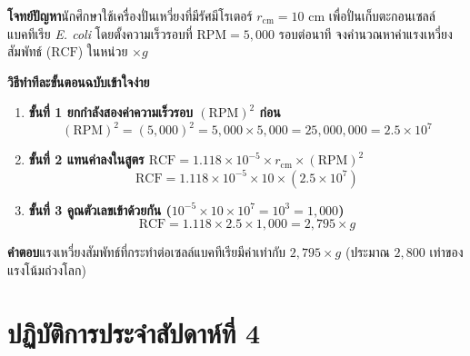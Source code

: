 \vspace{4pt}


\begin{worked}
\textbf{โจทย์ปัญหา}\quad นักศึกษาใช้เครื่องปั่นเหวี่ยงที่มีรัศมีโรเตอร์ $r_{\text{cm}} = 10\text{ cm}$ เพื่อปั่นเก็บตะกอนเซลล์แบคทีเรีย \textit{E. coli} โดยตั้งความเร็วรอบที่ $\text{RPM} = 5{,}000\text{ รอบต่อนาที}$ จงคำนวณหาค่าแรงเหวี่ยงสัมพัทธ์ ($\text{RCF}$) ในหน่วย $\times g$

\textbf{วิธีทำทีละขั้นตอนฉบับเข้าใจง่าย}
\begin{enumerate}
    \item \textbf{ขั้นที่ 1 ยกกำลังสองค่าความเร็วรอบ $(\text{RPM})^2$ ก่อน}
    \[
        (\text{RPM})^2 = (5{,}000)^2 = 5{,}000 \times 5{,}000 = 25{,}000{,}000 = 2.5 \times 10^7
    \]
    \item \textbf{ขั้นที่ 2 แทนค่าลงในสูตร $\text{RCF} = 1.118 \times 10^{-5} \times r_{\text{cm}} \times (\text{RPM})^2$}
    \[
        \text{RCF} = 1.118 \times 10^{-5} \times 10 \times (2.5 \times 10^7)
    \]
    \item \textbf{ขั้นที่ 3 คูณตัวเลขเข้าด้วยกัน ($10^{-5} \times 10 \times 10^7 = 10^3 = 1{,}000$)}
    \[
        \text{RCF} = 1.118 \times 2.5 \times 1{,}000 = 2{,}795 \times g
    \]
\end{enumerate}
\textbf{คำตอบ}\quad แรงเหวี่ยงสัมพัทธ์ที่กระทำต่อเซลล์แบคทีเรียมีค่าเท่ากับ $2{,}795 \times g$ (ประมาณ $2{,}800$ เท่าของแรงโน้มถ่วงโลก)
\end{worked}

\section{ปฏิบัติการประจำสัปดาห์ที่ 4}


